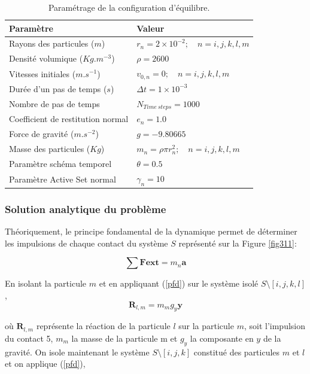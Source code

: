 \begin{center}
\begin{table}[!h]
\begin{tabular}{ |p{5.75cm}|p{6.8cm}| }
 \hline \rowcolor{lightgray}

 Paramètre& Valeur\\
 \hline
 Rayons des particules ($m$) & $r_n = 2\times10^{-2}; \quad n = i,j,k,l,m$\\
 Densité volumique ($Kg.m^{-3}$)& $\rho = 2600$\\
 Vitesses initiales ($m.s^{-1}$)  &$v_{0,n} = 0; \quad n = i,j,k,l,m$\\
 Durée d'un pas de temps ($s$)&   $\Delta t = 1\times10^{-3}$\\
 Nombre de pas de temps& $N_{Time\ steps} = 1000$\\
 Coefficient de restitution normal& $e_n = 1.0$\\
 Force de gravité ($m.s^{-2}$)& $g = -9.80665$\\
 Masse des particules ($Kg$)  &$m_n = \rho \pi r_n^{2}; \quad n = i,j,k,l,m$\\
 Paramètre schéma temporel & $\theta = 0.5$\\
 Paramètre Active Set normal &$\gamma_n = 10$\\
 \hline
\end{tabular}
\caption{Paramétrage de la configuration d'équilibre.}
\end{table}
\end{center}
    
\subsubsection{Solution analytique du problème}    
    
Théoriquement, le principe fondamental de la dynamique permet de déterminer les impulsions de chaque contact du système $S$ représenté sur la Figure \ref{fig311}:

\begin{equation}\label{pfd}
    \sum{\textbf{F{ext}}} = m_n\textbf{a}
\end{equation}
 
 En isolant la particule $m$ et en appliquant (\ref{pfd}) sur le système isolé $S \setminus{[i,j,k,l]}$, 
 \begin{equation}
    \textbf{R}_{l,m} = m_mg_y\textbf{y}
 \end{equation}

où $\textbf{R}_{l,m}$ représente la réaction de la particule $l$ sur la particule $m$, soit l'impulsion du contact 5, $m_m$ la masse de la particule m et $g_y$ la composante en $y$ de la gravité.
On isole maintenant le système $S \setminus{[i,j,k]}$ constitué des particules $m$ et $l$ et on applique (\ref{pfd}),

